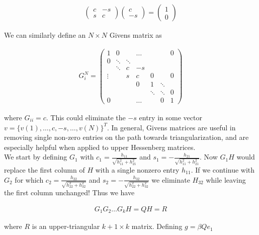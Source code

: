 \documentclass[11pt]{article}
\begin{document}
\begin{align*}
  \begin{pmatrix} c & -s \\ s & c \end{pmatrix} \begin{pmatrix} c \\ -s \end{pmatrix} = \begin{pmatrix} 1 \\ 0 \end{pmatrix}
\end{align*}

We can similarly define an $N \times N$ Givens matrix as

\begin{align*}
  G_i^N = \begin{pmatrix} 1 & 0 & & \dots & & & 0 \\ 0 & \ddots & \ddots & & & & \\ & \ddots & c & -s & & & \\ \vdots & & s & c & 0 & & 0 \\ & & & 0 & 1 & \ddots & \\ & & & & \ddots & \ddots & 0 \\ 0 & & & \dots & & 0 & 1 \end{pmatrix}
\end{align*}

where $G_{ii} = c$. This could eliminate the $-s$ entry in some vector $v = \{v(1), \dots , c, -s, \dots, v(N)\}^T$. In general, Givens matrices are useful in removing single non-zero entries on the path towards triangularization, and are especially helpful when applied to upper Hessenberg matrices. \\

We start by defining $G_1$ with $c_1 = \frac{h_{11}}{\sqrt{h_{11}^2 + h_{21}^2}}$ and $s_1 = -\frac{h_{21}}{\sqrt{h_{11}^2 + h_{21}^2}}$. Now $G_1 H$ would replace the first column of $H$ with a single nonzero entry $h_{11}$. If we continue with $G_2$ for which $c_2 = \frac{h_{22}}{\sqrt{h_{22}^2 + h_{32}^2}}$ and $s_2 = -\frac{h_{32}}{\sqrt{h_{22}^2 + h_{32}^2}}$ we eliminate $H_{32}$ while leaving the first column unchanged! Thus we have

\begin{align*}
  G_1 G_2 \dots G_k H = QH = R
\end{align*}

where $R$ is an upper-triangular $k+1 \times k$ matrix. Defining $g = \beta Q e_1$
\end{document}
